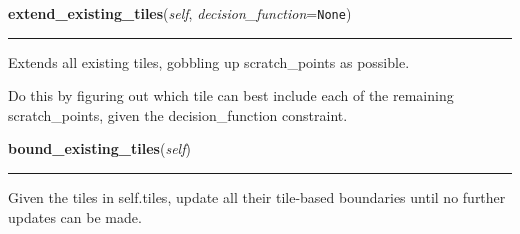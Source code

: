     \label{Tiling:Domain:extend_existing_tiles}

    \vspace{0.5ex}

\hspace{.8\funcindent}\begin{boxedminipage}{\funcwidth}

    \raggedright \textbf{extend\_existing\_tiles}(\textit{self}, \textit{decision\_function}={\tt None})

    \vspace{-1.5ex}

    \rule{\textwidth}{0.5\fboxrule}
\setlength{\parskip}{2ex}
    Extends all existing tiles, gobbling up scratch\_points as possible.

    Do this by figuring out which tile can best include each of the 
    remaining scratch\_points, given the decision\_function constraint.

\setlength{\parskip}{1ex}
    \end{boxedminipage}

    \label{Tiling:Domain:bound_existing_tiles}

    \vspace{0.5ex}

\hspace{.8\funcindent}\begin{boxedminipage}{\funcwidth}

    \raggedright \textbf{bound\_existing\_tiles}(\textit{self})

    \vspace{-1.5ex}

    \rule{\textwidth}{0.5\fboxrule}
\setlength{\parskip}{2ex}
    Given the tiles in self.tiles, update all their tile-based boundaries 
    until no further updates can be made.

\setlength{\parskip}{1ex}
    \end{boxedminipage}

    \label{Tiling:Domain:get_osculating_tiles}

    \vspace{0.5ex}

